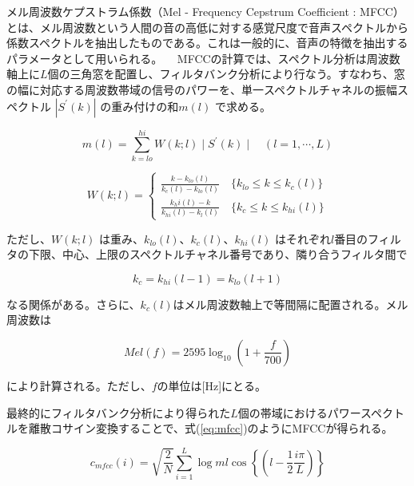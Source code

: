 \par
メル周波数ケプストラム係数（Mel - Frequency Cepstrum Coefficient : MFCC）とは、メル周波数という人間の音の高低に対する感覚尺度で音声スペクトルから係数スペクトルを抽出したものである\cite{sp_recognition_shikano}。これは一般的に、音声の特徴を抽出するパラメータとして用いられる。
　MFCCの計算では、スペクトル分析は周波数軸上に$L$個の三角窓を配置し、フィルタバンク分析により行なう。すなわち、窓の幅に対応する周波数帯域の信号のパワーを、単一スペクトルチャネルの振幅スペクトル $|S^\prime (k)|$ の重み付けの和$m(l)$ で求める。

\begin{equation}
m(l)=\sum_{k=lo}^{hi}W(k;l)\mid S^\prime(k)\mid \quad (l=1,\cdots,L)
\end{equation}

\begin{equation}
W(k;l)=\begin{cases}\frac{k-k_{lo}(l)}{k_c(l)-k_{lo}(l)}\quad \{k_{lo}\leq k \leq k_c(l)\} \\\frac{k_hi(l)-k}{k_{hi}(l)-k_{l}(l)}\quad \{k_{c}\leq k \leq k_{hi}(l)\} \end{cases}
\end{equation}

ただし、$W(k;l)$ は重み、$k_{lo}(l)、k_c(l)、k_{hi}(l)$ はそれぞれ$l$番目のフィルタの下限、中心、上限のスペクトルチャネル番号であり、隣り合うフィルタ間で

\begin{equation}
k_c=k_{hi}(l-1)=k_{lo}(l+1)
\end{equation}

なる関係がある。さらに、$k_c(l)$はメル周波数軸上で等間隔に配置される。メル周波数は

\begin{equation}
Mel(f)=2595\log_{10}(1+\frac{f}{700})
\end{equation}

により計算される。ただし、$f$の単位は[Hz]にとる。\par
最終的にフィルタバンク分析により得られた$L$個の帯域におけるパワースペクトルを離散コサイン変換することで、式(\ref{eq:mfcc})のようにMFCCが得られる。

\begin{equation}
\label{eq:mfcc}
c_{mfcc}(i)=\sqrt{\frac{2}{N}}\sum_{i=1}^{L}\log ml \cos \left\{ \left( l-\frac{1}{2}\frac{i\pi}{L} \right)\right\}
\end{equation}


